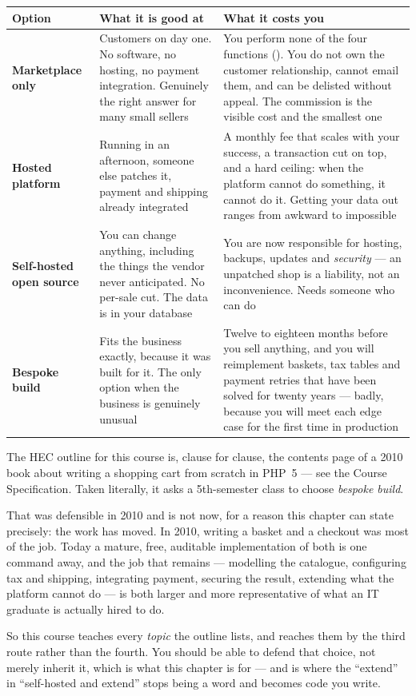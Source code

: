 \begin{longtable}{@{}L{2.8cm}L{5.8cm}L{6.0cm}@{}}
\toprule
{}
\textbf{Option} & \textbf{What it is good at} & \textbf{What it costs you} \\
\midrule
\endhead
\textbf{Marketplace only} & Customers on day one. No software, no hosting, no
payment integration. Genuinely the right answer for many small sellers & You
perform none of the four functions (). You do not own the customer
relationship, cannot email them, and can be delisted without appeal. The
commission is the visible cost and the smallest one \\
\textbf{Hosted platform} & Running in an afternoon, someone else patches it,
payment and shipping already integrated & A monthly fee that scales with your
success, a transaction cut on top, and a hard ceiling: when the platform
cannot do something, it cannot do it. Getting your data out ranges from
awkward to impossible \\
\textbf{Self-hosted open source} & You can change anything, including the
things the vendor never anticipated. No per-sale cut. The data is in your
database & You are now responsible for hosting, backups, updates and
\emph{security} --- an unpatched shop is a liability, not an inconvenience.
Needs someone who can do  \\
\textbf{Bespoke build} & Fits the business exactly, because it was built for
it. The only option when the business is genuinely unusual & Twelve to
eighteen months before you sell anything, and you will reimplement baskets,
tax tables and payment retries that have been solved for twenty years ---
badly, because you will meet each edge case for the first time in production \\
\bottomrule
\end{longtable}

\begin{alertbox}
The HEC outline for this course is, clause for clause, the contents page of a
2010 book about writing a shopping cart from scratch in PHP~5 --- see the
Course Specification. Taken literally, it asks a 5th-semester class to choose
\emph{bespoke build}.

\smallskip
That was defensible in 2010 and is not now, for a reason this chapter can
state precisely: the work has moved. In 2010, writing a basket and a checkout
was most of the job. Today a mature, free, auditable implementation of both is
one command away, and the job that remains --- modelling the catalogue,
configuring tax and shipping, integrating payment, securing the result,
extending what the platform cannot do --- is both larger and more
representative of what an IT graduate is actually hired to do.

\smallskip
So this course teaches every \emph{topic} the outline lists, and reaches them
by the third route rather than the fourth. You should be able to defend that
choice, not merely inherit it, which is what this chapter is for --- and
 is where the ``extend'' in ``self-hosted and extend'' stops
being a word and becomes code you write.
\end{alertbox}

